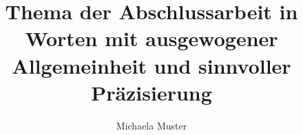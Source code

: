 \documentclass[fontsize=12pt, paper=a4, DIV=13, BCOR=10mm, logostyle=flat,
	twoside, %
]{OTHRreprt}
\title{Thema der Abschlussarbeit in Worten mit ausgewogener Allgemeinheit und sinnvoller Präzisierung}
\author{Michaela Muster}
\begin{document}
\maketitle

\makedeclaration

\cleardoublepage

\tableofcontents

\cleardoublepage

\blinddocument
\end{document}
